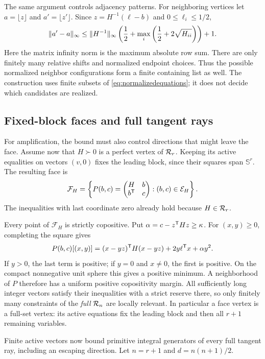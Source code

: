 The same argument controls adjacency patterns. For neighboring vertices let $a=\lfloor z\rfloor$ and $a'=\lfloor z'\rfloor$. Since $z=H^{-1}(\ell-b)$ and $0\le\ell_i\le1/2$,
\[
 \lVert a'-a\rVert_\infty\le
 \lVert H^{-1}\rVert_\infty
 \left(\frac12+\max_i\left(\frac12+2\sqrt{H_{ii}}\right)\right)+1.
\]
Here the matrix infinity norm is the maximum absolute row sum. There are only finitely many relative shifts and normalized endpoint choices. Thus the possible normalized neighbor configurations form a finite containing list as well. The construction uses finite subsets of \eqref{eq:normalizedequations}; it does not decide which candidates are realized.

\subsection{Fixed-block faces and full tangent rays}\label{sec:face}
For amplification, the bound must also control directions that might leave the face. Assume now that $H\succ0$ is a perfect vertex of $\mathcal R_r$. Keeping its active equalities on vectors $(v,0)$ fixes the leading block, since their squares span $\mathbb S^r$. The resulting face is
\begin{equation}\label{eq:face}
 \mathcal F_H=\left\{P(b,c)=\begin{pmatrix}H&b\\b^{\mathsf T}&c\end{pmatrix}:
                 (b,c)\in\mathcal E_H\right\}.
\end{equation}
The inequalities with last coordinate zero already hold because $H\in\mathcal R_r$.

Every point of $\mathcal F_H$ is strictly copositive. Put $\alpha=c-z^{\mathsf T} Hz\ge\kappa$. For $(x,y)\ge0$, completing the square gives
\begin{equation}\label{eq:strictface}
 P(b,c)[(x,y)]=(x-yz)^{\mathsf T} H(x-yz)+2y\ell^{\mathsf T} x+\alpha y^2.
\end{equation}
If $y>0$, the last term is positive; if $y=0$ and $x\ne0$, the first is positive. On the compact nonnegative unit sphere this gives a positive minimum. A neighborhood of $P$ therefore has a uniform positive copositivity margin. All sufficiently long integer vectors satisfy their inequalities with a strict reserve there, so only finitely many constraints of the \emph{full} $\mathcal R_n$ are locally relevant. In particular a face vertex is a full-set vertex: its active equations fix the leading block and then all $r+1$ remaining variables.

Finite active vectors now bound primitive integral generators of every full tangent ray, including an escaping direction. Let $n=r+1$ and $d=n(n+1)/2$.

